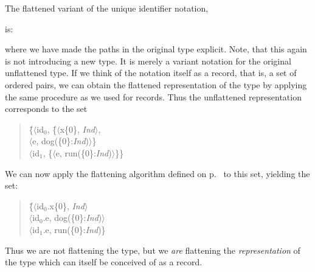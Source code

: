 The flattened variant of the unique identifier notation,
\begin{quote}
\end{quote}
is:
\begin{quote}
\end{quote}
where we have made the paths in the original type explicit.  Note,
that this again is not introducing a new type.  It is merely a variant
notation for the original unflattened type.  If we think of the
notation itself as a record, that is, a set of ordered pairs, we can
obtain the flattened representation of the type by applying the same
procedure as we used for records.  Thus the unflattened representation
corresponds to the set
\begin{quote}
\begin{tabbing}
\{\=$\langle$id$_0$, \{\=$\langle$x\{0\}, \textit{Ind}$\rangle$,\\
\>\>                    $\langle$e, dog(\{0\}:\textit{Ind})$\rangle$\}\\
\>$\langle$id$_1$, \{$\langle$e, run(\{0\}:\textit{Ind})$\rangle$\}\}
\end{tabbing}
\end{quote}
We can now apply the flattening algorithm defined on
p.~\pageref{pg:flattening} to this set, yielding the set:
\begin{quote}
\begin{tabbing}
\{\=$\langle$id$_0$.x\{0\}, \textit{Ind}$\rangle$\\
\>  $\langle$id$_0$.e, dog(\{0\}:\textit{Ind})$\rangle$\\
\>  $\langle$id$_1$.e, run(\{0\}:\textit{Ind})\}
\end{tabbing}
\end{quote}
Thus we are not flattening the
type, but we \emph{are} flattening the \emph{representation} of the type
which can itself
be conceived of as a record.

